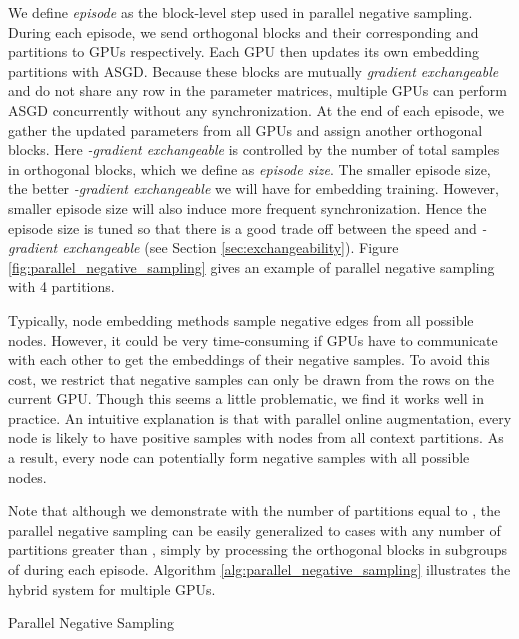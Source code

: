 \documentclass[sigconf]{acmart}
\newcommand{\property}[1]{\textit{#1}}
\begin{document}
We define \emph{episode} as the block-level step used in parallel negative sampling. During each episode, we send  orthogonal blocks and their corresponding  and  partitions to  GPUs respectively. Each GPU then updates its own embedding partitions with ASGD. Because these blocks are mutually \property{gradient exchangeable} and do not share any row in the parameter matrices, multiple GPUs can perform ASGD concurrently without any synchronization. At the end of each episode, we gather the updated parameters from all GPUs and assign another  orthogonal blocks. Here \property{-gradient exchangeable} is controlled by the number of total samples in  orthogonal blocks, which we define as \emph{episode size}. The smaller episode size, the better \property{-gradient exchangeable} we will have for embedding training. However, smaller episode size will also induce more frequent synchronization. Hence the episode size is tuned so that there is a good trade off between the speed and \property{-gradient exchangeable} (see Section \ref{sec:exchangeability}). Figure \ref{fig:parallel_negative_sampling} gives an example of parallel negative sampling with 4 partitions.

Typically, node embedding methods sample negative edges from all possible nodes. However, it could be very time-consuming if GPUs have to communicate with each other to get the embeddings of their negative samples. To avoid this cost, we restrict that negative samples can only be drawn from the  rows on the current GPU. Though this seems a little problematic, we find it works well in practice. An intuitive explanation is that with parallel online augmentation, every node is likely to have positive samples with nodes from all context partitions. As a result, every node can potentially form negative samples with all possible nodes.

Note that although we demonstrate with the number of partitions equal to , the parallel negative sampling can be easily generalized to cases with any number of partitions greater than , simply by processing the orthogonal blocks in subgroups of  during each episode. Algorithm \ref{alg:parallel_negative_sampling} illustrates the hybrid system for multiple GPUs.

\begin{algorithm}
    \caption{Parallel Negative Sampling}
    \begin{algorithmic}[1]        
            \State{}
            \State{}
                \State{}
                \State{}
                     
                        \State{}
                        \State{}
                    \EndFor
                \EndFor
            \EndWhile
        \EndFunction
    \end{algorithmic}
    \label{alg:parallel_negative_sampling}
\end{algorithm}
\end{document}
